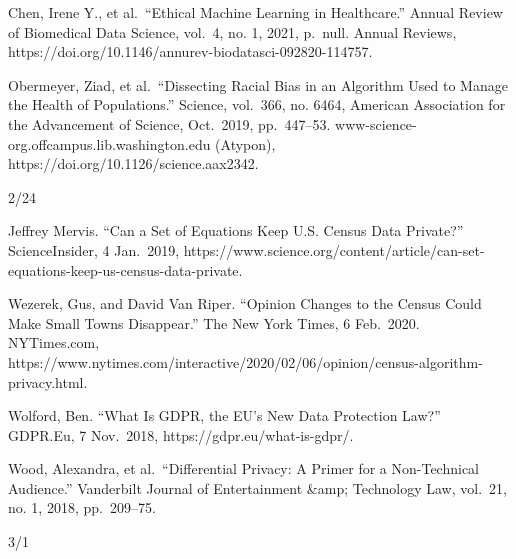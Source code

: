 \documentclass[
]{article}
\newlength{\cslhangindent}
\newlength{\cslentryspacingunit} %
\newenvironment{CSLReferences}[2] %
 {%
  \setlength{\parindent}{0pt}
  \ifodd #1
  \let\oldpar\par
  \def\par{\hangindent=\cslhangindent\oldpar}
  \fi
  \setlength{\parskip}{#2\cslentryspacingunit}
 }%
 {}
\begin{document}
\begin{CSLReferences}{0}{0}
Chen, Irene Y., et al.~``Ethical Machine Learning in Healthcare.''
Annual Review of Biomedical Data Science, vol.~4, no. 1, 2021, p.~null.
Annual Reviews,
https://doi.org/10.1146/annurev-biodatasci-092820-114757.

{}

Obermeyer, Ziad, et al.~``Dissecting Racial Bias in an Algorithm Used to
Manage the Health of Populations.'' Science, vol.~366, no. 6464,
American Association for the Advancement of Science, Oct.~2019,
pp.~447--53. www-science-org.offcampus.lib.washington.edu (Atypon),
https://doi.org/10.1126/science.aax2342.

{}

\end{CSLReferences}

2/24

\begin{CSLReferences}{0}{0}
Jeffrey Mervis. ``Can a Set of Equations Keep U.S. Census Data
Private?'' ScienceInsider, 4 Jan.~2019,
https://www.science.org/content/article/can-set-equations-keep-us-census-data-private.

{}

Wezerek, Gus, and David Van Riper. ``Opinion \textbar{} Changes to the
Census Could Make Small Towns Disappear.'' The New York Times, 6
Feb.~2020. NYTimes.com,
https://www.nytimes.com/interactive/2020/02/06/opinion/census-algorithm-privacy.html.

{}

Wolford, Ben. ``What Is GDPR, the EU's New Data Protection Law?''
GDPR.Eu, 7 Nov.~2018, https://gdpr.eu/what-is-gdpr/.

{}

Wood, Alexandra, et al.~``Differential Privacy: A Primer for a
Non-Technical Audience.'' Vanderbilt Journal of Entertainment \&amp;
Technology Law, vol.~21, no. 1, 2018, pp.~209--75.

{}

\end{CSLReferences}

3/1
\end{document}
